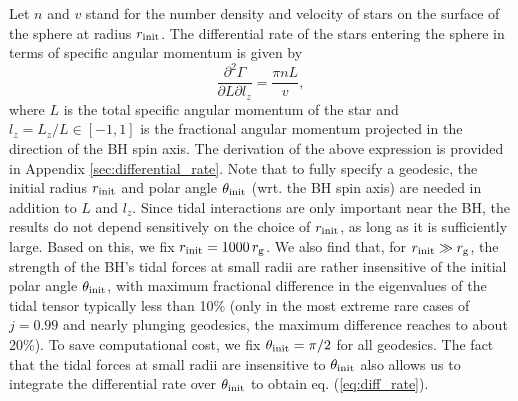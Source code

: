 \documentclass[useAMS,usenatbib]{mn2e}
\def\rg{r_{\rm g}}
\def\rinit{r_{\rm init}}
\def\thetainit{\theta_{\rm init}}
\def\note{\textcolor{magenta}}
\begin{document}
Let $n$ and $v$ stand for the number density and velocity of stars on the surface of the sphere at radius $\rinit$.
The differential rate of the stars entering the sphere in terms of specific angular momentum is given by
\begin{equation}\label{eq:diff_rate}
    \frac{\partial^2\Gamma}{\partial L\partial l_z}=\frac{\pi nL}{v},
\end{equation}
where $L$ is the total specific angular momentum of the star and $l_z=L_z/L\in[-1,1]$ is the fractional angular momentum projected in the direction of the BH spin axis.
The derivation of the above expression is provided in Appendix \ref{sec:differential_rate}.
Note that to fully specify a geodesic, the initial radius $\rinit$ and polar angle $\thetainit$ (wrt. the BH spin axis) are needed in addition to $L$ and $l_z$. Since tidal interactions are only important near the BH, the results do not depend sensitively on the choice of $\rinit$, as long as it is sufficiently large. Based on this, we fix $\rinit=1000\,\rg$. We also find that, for $\rinit\gg\rg$, the strength of the BH's tidal forces at small radii are rather insensitive of the initial polar angle $\thetainit$, with maximum fractional difference in the eigenvalues of the tidal tensor typically less than 10\% (only in the most extreme rare cases of $j=0.99$ and nearly plunging geodesics, the maximum difference reaches to about 20\%).
To save computational cost, we fix $\thetainit=\pi/2$ for all geodesics. The fact that the tidal forces at small radii are insensitive to $\thetainit$ also allows us to integrate the differential rate over $\thetainit$ to obtain eq. (\ref{eq:diff_rate}).
\end{document}

